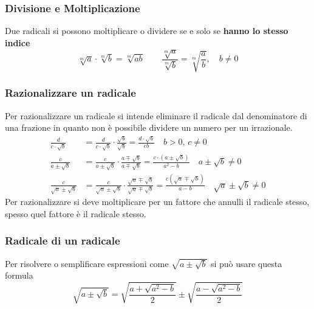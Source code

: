 \subsubsection{Divisione e Moltiplicazione}
Due radicali si possono moltiplicare o dividere se e solo se \textbf{hanno lo stesso indice}
\begin{equation*}
  \sqrt[m]{a}\cdot\sqrt[m]{b} = \sqrt[m]{ab}\qquad\frac{\sqrt[m]{a}}{\sqrt[m]{b}} = \sqrt[m]{\frac{a}{b}}
  ,\quad b \neq 0
\end{equation*}

\subsubsection{Razionalizzare un radicale}
Per razionalizzare un radicale si intende eliminare il radicale dal denominatore di una frazione in
quanto non è possibile dividere un numero per un irrazionale.
\begin{align*}
  \frac{d}{c\cdot\sqrt{b}} & = \frac{d}{c\cdot\sqrt{b}}\cdot\frac{\sqrt{b}}{\sqrt{b}} = 
  \frac{d\cdot\sqrt{b}}{cb} \quad b > 0,\, c \neq 0 \\
  \frac{c}{a\pm\sqrt{b}} &= \frac{c}{a\pm\sqrt{b}}\cdot\frac{a\mp\sqrt{b}}{a\mp\sqrt{b}} = 
  \frac{c\cdot(a\pm\sqrt{b})}{a^2-b} \quad a\pm\sqrt{b} \neq 0 \\
  \frac{c}{\sqrt{a}\pm\sqrt{b}} &=
  \frac{c}{\sqrt{a}\pm\sqrt{b}}\cdot\frac{\sqrt{a}\mp\sqrt{b}}{\sqrt{a}\mp\sqrt{b}} =
  \frac{c(\sqrt{a}\mp\sqrt{b})}{a-b} \quad \sqrt{a}\pm\sqrt{b} \neq 0
\end{align*}
Per razionalizzare si deve moltiplicare per un fattore che annulli il radicale stesso, 
spesso quel fattore è il radicale stesso.

\subsubsection{Radicale di un radicale}
Per risolvere o semplificare espressioni come $\sqrt{a\pm\sqrt{b}}$ si può usare questa formula
\begin{equation*}
  \sqrt{a\pm\sqrt{b}} = \sqrt{\frac{a+\sqrt{a^2-b}}{2}}\pm\sqrt{\frac{a-\sqrt{a^2-b}}{2}}
\end{equation*}

